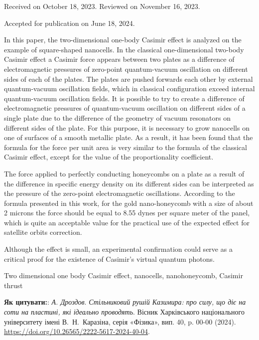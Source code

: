 \documentclass[twoside, 10pt, ptm]{article}
\def\mynameukr{А. Дроздов}
\def\mytitleukr{Стільниковий рушій Казимира: про силу, що діє на соти на пластині, які ідеально проводять}
\def\mydoi{10.26565/2222-5617-2024-40-04}
\def\ukrvisnyk{Вісник Харківського національного університету імені В.~Н.~Каразіна, серія «Фізика», вип. 40, p. 00-00 (2024)}
\def\myreceived{Received on October 18, 2023. Reviewed on November 16, 2023.}
\def\myaccepted{Accepted for publication on June 18, 2024.}
\begin{document}
\vspace{3mm}
\centerline{\myreceived}
\centerline{\myaccepted}

\vspace{3.5mm}

{\selectfont
In this paper, the two-dimensional one-body Casimir effect is analyzed
on the example of square-shaped nanocells.
In the classical one-dimensional two-body Casimir effect a Casimir force
appears between two plates as a difference of electromagnetic pressures
of zero-point quantum-vacuum oscillation on different sides of each of the plates.
The plates are pushed forwards each other by external quantum-vacuum oscillation fields,
which in classical configuration exceed internal quantum-vacuum oscillation fields.
It is possible to try to create a difference of electromagnetic pressures
of quantum-vacuum oscillation on different sides of a single plate
due to the difference of the geometry of vacuum resonators on different sides of the plate.
For this purpose, it is necessary to grow nanocells on one of surfaces of a smooth metallic plate.
As a result, it has been found that the formula for the force per unit area is very similar to the formula of the classical Casimir effect,
except for the value of the proportionality coefficient.

The force applied to perfectly conducting honeycombs on a plate as a result of the
difference in specific energy density on its different sides can be interpreted
as the pressure of the zero-point electromagnetic oscillations.
According to the formula presented in this work, for the gold nano-honeycomb
with a size of about 2 microns the force should be equal to 8.55 dynes per square meter of the panel, which is quite
an acceptable value for the practical use of the expected effect for satellite orbits correction.

    Although the effect is small, an experimental confirmation
could serve as a critical proof for the existence of Casimir's virtual quantum photons.

}


\begin{keywords}
Two dimensional one body Casimir effect, nanocells, nanohoneycomb, Casimir thrust
\end{keywords}

\vspace{5mm}

\noindent
\textbf{Як цитувати:}: \textit{\mynameukr}. \textit{\mytitleukr}. {\ukrvisnyk}. \href{https://doi.org/\mydoi}{https://doi.org/\mydoi}.
\end{document}
